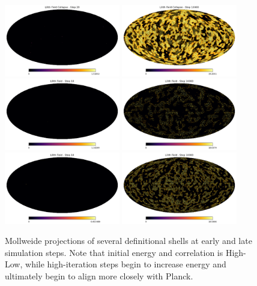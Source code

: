 \begin{figure}[ht]
  \centering
  \includegraphics[width=0.45\textwidth]{images/mollweide_000020.png}
  \includegraphics[width=0.45\textwidth]{images/mollweide_010000.png}
  \includegraphics[width=0.45\textwidth]{images/mollweide1_000010.png}
  \includegraphics[width=0.45\textwidth]{images/mollweide1_010000.png}
  \includegraphics[width=0.45\textwidth]{images/mollweide2_000010.png}
  \includegraphics[width=0.45\textwidth]{images/mollweide2_010000.png}
  \caption{Mollweide projections of several definitional shells at early and late simulation steps. Note that initial energy and correlation is High-Low, while high-iteration steps begin to increase energy and ultimately begin to align more closely with Planck.}
\end{figure}

